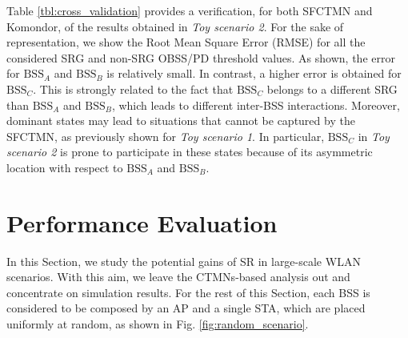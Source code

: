 \documentclass{ieeeaccess}
\begin{document}
Table \ref{tbl:cross_validation} provides a verification, for both SFCTMN and Komondor, of the results obtained in \emph{Toy scenario 2}. For the sake of representation, we show the Root Mean Square Error (RMSE) for all the considered SRG and non-SRG OBSS/PD threshold values. As shown, the error for $\text{BSS}_A$ and $\text{BSS}_B$ is relatively small. In contrast, a higher error is obtained for $\text{BSS}_C$. This is strongly related to the fact that $\text{BSS}_C$ belongs to a different SRG than $\text{BSS}_A$ and $\text{BSS}_B$, which leads to different inter-BSS interactions. Moreover, dominant states may lead to situations that cannot be captured by the SFCTMN, as previously shown for \emph{Toy scenario 1}. In particular, $\text{BSS}_C$ in \emph{Toy scenario 2} is prone to participate in these states because of its asymmetric location with respect to $\text{BSS}_A$ and $\text{BSS}_B$.
\begin{table}[ht!]
	\centering
	\caption{Verification of the results obtained in \emph{Toy scenario 2} from the SFCTMN and Komondor.}
	\label{tbl:cross_validation}
\end{table}


\section{Performance Evaluation}
\label{section:performance_evaluation}

In this Section, we study the potential gains of SR in large-scale WLAN scenarios. With this aim, we leave the CTMNs-based analysis out and concentrate on simulation results. For the rest of this Section, each BSS is considered to be composed by an AP and a single STA, which are placed uniformly at random, as shown in Fig. \ref{fig:random_scenario}. 
\end{document}

